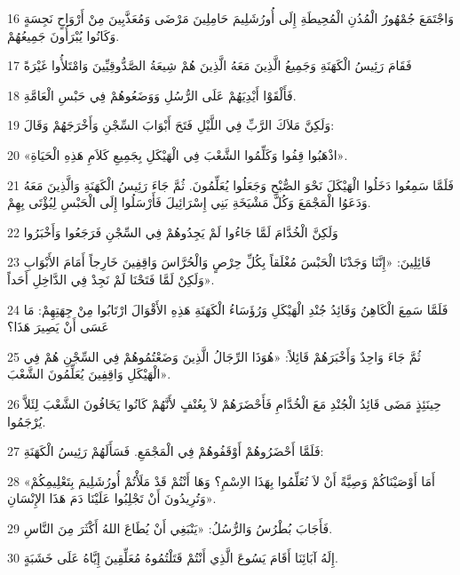 \par 16 وَاجْتَمَعَ جُمْهُورُ الْمُدُنِ الْمُحِيطَةِ إِلَى أُورُشَلِيمَ حَامِلِينَ مَرْضَى وَمُعَذَّبِينَ مِنْ أَرْوَاحٍ نَجِسَةٍ وَكَانُوا يُبْرَأُونَ جَمِيعُهُمْ.
\par 17 فَقَامَ رَئِيسُ الْكَهَنَةِ وَجَمِيعُ الَّذِينَ مَعَهُ الَّذِينَ هُمْ شِيعَةُ الصَّدُّوقِيِّينَ وَامْتَلأُوا غَيْرَةً
\par 18 فَأَلْقَوْا أَيْدِيَهُمْ عَلَى الرُّسُلِ وَوَضَعُوهُمْ فِي حَبْسِ الْعَامَّةِ.
\par 19 وَلَكِنَّ مَلاَكَ الرَّبِّ فِي اللَّيْلِ فَتَحَ أَبْوَابَ السِّجْنِ وَأَخْرَجَهُمْ وَقَالَ:
\par 20 «اذْهَبُوا قِفُوا وَكَلِّمُوا الشَّعْبَ فِي الْهَيْكَلِ بِجَمِيعِ كَلاَمِ هَذِهِ الْحَيَاةِ».
\par 21 فَلَمَّا سَمِعُوا دَخَلُوا الْهَيْكَلَ نَحْوَ الصُّبْحِ وَجَعَلُوا يُعَلِّمُونَ. ثُمَّ جَاءَ رَئِيسُ الْكَهَنَةِ وَالَّذِينَ مَعَهُ وَدَعَوُا الْمَجْمَعَ وَكُلَّ مَشْيَخَةِ بَنِي إِسْرَائِيلَ فَأَرْسَلُوا إِلَى الْحَبْسِ لِيُؤْتَى بِهِمْ.
\par 22 وَلَكِنَّ الْخُدَّامَ لَمَّا جَاءُوا لَمْ يَجِدُوهُمْ فِي السِّجْنِ فَرَجَعُوا وَأَخْبَرُوا
\par 23 قَائِلِينَ: «إِنَّنَا وَجَدْنَا الْحَبْسَ مُغْلَقاً بِكُلِّ حِرْصٍ وَالْحُرَّاسَ وَاقِفِينَ خَارِجاً أَمَامَ الأَبْوَابِ وَلَكِنْ لَمَّا فَتَحْنَا لَمْ نَجِدْ فِي الدَّاخِلِ أَحَداً».
\par 24 فَلَمَّا سَمِعَ الْكَاهِنُ وَقَائِدُ جُنْدِ الْهَيْكَلِ وَرُؤَسَاءُ الْكَهَنَةِ هَذِهِ الأَقْوَالَ ارْتَابُوا مِنْ جِهَتِهِمْ: مَا عَسَى أَنْ يَصِيرَ هَذَا؟
\par 25 ثُمَّ جَاءَ وَاحِدٌ وَأَخْبَرَهُمْ قَائِلاً: «هُوَذَا الرِّجَالُ الَّذِينَ وَضَعْتُمُوهُمْ فِي السِّجْنِ هُمْ فِي الْهَيْكَلِ وَاقِفِينَ يُعَلِّمُونَ الشَّعْبَ».
\par 26 حِينَئِذٍ مَضَى قَائِدُ الْجُنْدِ مَعَ الْخُدَّامِ فَأَحْضَرَهُمْ لاَ بِعُنْفٍ لأَنَّهُمْ كَانُوا يَخَافُونَ الشَّعْبَ لِئَلاَّ يُرْجَمُوا.
\par 27 فَلَمَّا أَحْضَرُوهُمْ أَوْقَفُوهُمْ فِي الْمَجْمَعِ. فَسَأَلَهُمْ رَئِيسُ الْكَهَنَةِ:
\par 28 «أَمَا أَوْصَيْنَاكُمْ وَصِيَّةً أَنْ لاَ تُعَلِّمُوا بِهَذَا الاِسْمِ؟ وَهَا أَنْتُمْ قَدْ مَلَأْتُمْ أُورُشَلِيمَ بِتَعْلِيمِكُمْ وَتُرِيدُونَ أَنْ تَجْلِبُوا عَلَيْنَا دَمَ هَذَا الإِنْسَانِ».
\par 29 فَأَجَابَ بُطْرُسُ وَالرُّسُلُ: «يَنْبَغِي أَنْ يُطَاعَ اللهُ أَكْثَرَ مِنَ النَّاسِ.
\par 30 إِلَهُ آبَائِنَا أَقَامَ يَسُوعَ الَّذِي أَنْتُمْ قَتَلْتُمُوهُ مُعَلِّقِينَ إِيَّاهُ عَلَى خَشَبَةٍ.

